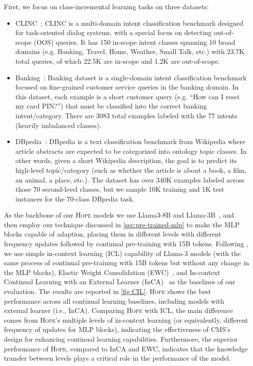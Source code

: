 \documentclass{article}
\newcommand{\citep}{\parencite}
\newcommand{\citet}{\textcite}
\newcommand{\head}[1]{\vspace{1.7mm}\noindent{{\textcolor{c4}{\bf #1.}}}}
\newcommand{\model}[0]{\textsc{Hope}}
\begin{document}
{\head{Class Incremental Learning}
First, we focus on class-incremental learning tasks on three datasets: 
\begin{itemize}
    \item CLINC~\citep{larson2019evaluation}: CLINC is a multi-domain intent classification benchmark designed for task-oriented dialog systems, with a special focus on detecting out-of-scope (OOS) queries. It has 150 in-scope intent classes spanning 10 broad domains (e.g. Banking, Travel, Home, Weather, Small Talk, etc.) with 23.7K total queries, of which 22.5K are in-scope and 1.2K are out-of-scope. 
    \item Banking~\citep{casanueva2020efficient}: Banking dataset is a single-domain intent classification benchmark focused on fine-grained customer service queries in the banking domain. In this dataset, each example is a short customer query (e.g. “How can I reset my card PIN?”) that must be classified into the correct banking intent/category. There are 3083 total examples labeled with the 77 intents (heavily imbalanced classes).
    \item DBpedia~\citep{auer2007dbpedia}: DBpedia is a text classification benchmark from Wikipedia where article abstracts are expected to be categorized into ontology topic classes. In other words, given a short Wikipedia description, the goal is to predict its high-level topic/category (such as whether the article is about a book, a film, an animal, a place, etc.). The dataset has over 340K examples labeled across those 70 second-level classes, but we sample 10K training and 1K test instances for the 70-class DBpedia task.
\end{itemize}
As the backbone of our \model{} models we use Llama3-8B and Llama-3B~\citep{dubey2024llama}, and then employ our technique discussed in \autoref{sec:pre-trained-mlp} to make the MLP blocks capable of adaption, placing them in different levels with different frequency updates followed by continual pre-training with 15B tokens. Following \citet{momeni2025context}, we use simple in-context learning (ICL) capability of Llama-3 models (with the same process of continual pre-training with 15B tokens but without any change in the MLP blocks), Elastic Weight Consolidation (EWC)~\citep{kirkpatrick2017overcoming}, and In-context
Continual Learning with an External Learner (InCA)~\citep{momeni2025context}  as the baselines of our evaluation. The results are reported in \autoref{fig:CIL}. \model{} shows the best performance across all continual learning baselines, including models with external learner (i.e., InCA). Comparing \model{} with ICL, the main difference comes from \model's multiple levels of in-context learning (or equivalently, different frequency of updates for MLP blocks), indicating the effectiveness of CMS's design for enhancing continual learning capabilities. Furthermore, the superior performance of \model{}, compared to InCA and EWC, indicates that the knowledge transfer between levels plays a critical role in the performance of the model. 

}
\end{document}
